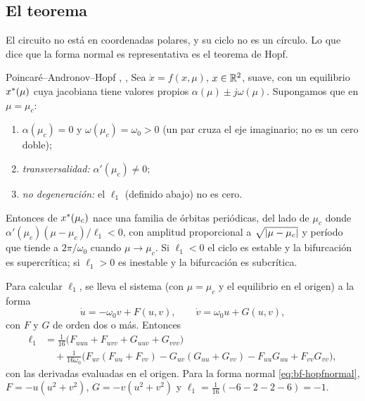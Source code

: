 
\subsection{El teorema}

El circuito no está en coordenadas polares, y su ciclo no es un círculo. Lo que dice que la forma normal es representativa es el teorema de Hopf.

\begin{teorema}[label=thm:bf-hopf]{Poincaré--Andronov--Hopf \citep{Hop42}, \citep[\S3.4]{GuHo83}, \citep[\S2.7]{Kha02}}
Sea $\dot x=f(x,\mu)$, $x\in\mathbb{R}^2$, suave, con un equilibrio $x^{*}(\mu)$ cuya jacobiana tiene valores propios $\alpha(\mu)\pm j\omega(\mu)$. Supongamos que en $\mu=\mu_c$:
\begin{enumerate}
  \item $\alpha(\mu_c)=0$ y $\omega(\mu_c)=\omega_0>0$ (un par cruza el eje imaginario; no es un cero doble);
  \item \emph{transversalidad:} $\alpha'(\mu_c)\neq0$;
  \item \emph{no degeneración:} el  $\ell_1$ (definido abajo) no es cero.
\end{enumerate}
Entonces de $x^{*}(\mu_c)$ nace una familia de órbitas periódicas, del lado de $\mu_c$ donde $\alpha'(\mu_c)(\mu-\mu_c)/\ell_1<0$, con amplitud proporcional a $\sqrt{\left\lvert \mu-\mu_c\right\rvert}$ y período que tiende a $2\pi/\omega_0$ cuando $\mu\to\mu_c$. Si $\ell_1<0$ el ciclo es estable y la bifurcación es supercrítica; si $\ell_1>0$ es inestable y la bifurcación es subcrítica.
\end{teorema}


Para calcular $\ell_1$, se lleva el sistema (con $\mu=\mu_c$ y el equilibrio en el origen) a la forma
\[
  \dot u=-\omega_0v+F(u,v),\qquad \dot v=\omega_0u+G(u,v),
\]
con $F$ y $G$ de orden dos o más. Entonces \citep[ec.~(3.4.11)]{GuHo83}
\begin{equation}
\begin{aligned}
  \ell_1&=\tfrac1{16}\bigl(F_{uuu}+F_{uvv}+G_{uuv}+G_{vvv}\bigr)\\
  &\quad+\tfrac1{16\omega_0}\bigl(F_{uv}(F_{uu}+F_{vv})-G_{uv}(G_{uu}+G_{vv})-F_{uu}G_{uu}+F_{vv}G_{vv}\bigr),
\end{aligned}
  \label{eq:bf-l1}
\end{equation}
con las derivadas evaluadas en el origen. Para la forma normal \eqref{eq:bf-hopfnormal}, $F=-u(u^2+v^2)$, $G=-v(u^2+v^2)$ y $\ell_1=\tfrac1{16}(-6-2-2-6)=-1$.

